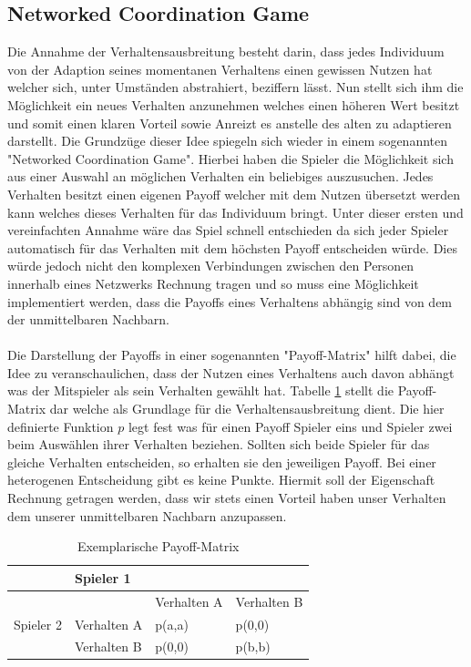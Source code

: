 \documentclass[12pt]{article}
\begin{document}
\subsection{Networked Coordination Game}
Die Annahme der Verhaltensausbreitung besteht darin, dass jedes Individuum von der Adaption seines momentanen Verhaltens einen gewissen Nutzen hat welcher sich, unter Umständen abstrahiert, beziffern lässt. Nun stellt sich ihm die Möglichkeit ein neues Verhalten anzunehmen welches einen höheren Wert besitzt und somit einen klaren Vorteil sowie Anreizt es anstelle des alten zu adaptieren darstellt. Die Grundzüge dieser Idee spiegeln sich wieder in einem sogenannten "Networked Coordination Game". Hierbei haben die Spieler die Möglichkeit sich aus einer Auswahl an möglichen Verhalten ein beliebiges auszusuchen. Jedes Verhalten besitzt einen eigenen Payoff welcher mit dem Nutzen übersetzt werden kann welches dieses Verhalten für das Individuum bringt. Unter dieser ersten und vereinfachten Annahme wäre das Spiel schnell entschieden da sich jeder Spieler automatisch für das Verhalten mit dem höchsten Payoff entscheiden würde. Dies würde jedoch nicht den komplexen Verbindungen zwischen den Personen innerhalb eines Netzwerks Rechnung tragen und so muss eine Möglichkeit implementiert werden, dass die Payoffs eines Verhaltens abhängig sind von dem der unmittelbaren Nachbarn.\\\\ Die Darstellung der Payoffs in einer sogenannten "Payoff-Matrix" hilft dabei, die Idee zu veranschaulichen, dass der Nutzen eines Verhaltens auch davon abhängt was der Mitspieler als sein Verhalten gewählt hat. Tabelle \ref{my-label} stellt die Payoff-Matrix dar welche als Grundlage für die Verhaltensausbreitung dient. Die hier definierte Funktion $p$ legt fest was für einen Payoff Spieler eins und Spieler zwei beim Auswählen ihrer Verhalten beziehen. Sollten sich beide Spieler für das gleiche Verhalten entscheiden, so erhalten sie den jeweiligen Payoff. Bei einer heterogenen Entscheidung gibt es keine Punkte. Hiermit soll der Eigenschaft Rechnung getragen werden, dass wir stets einen Vorteil haben unser Verhalten dem unserer unmittelbaren Nachbarn anzupassen.
\begin{table}[h]
\centering
\caption{Exemplarische Payoff-Matrix}
\label{my-label}
\begin{tabular}{|l|l|l|l|}
\hline
                           & \multicolumn{3}{l|}{Spieler 1}          \\ \hline
\multirow{3}{*}{Spieler 2} &             & Verhalten A & Verhalten B \\ \cline{2-4} 
                           & Verhalten A & p(a,a)      & p(0,0)      \\ \cline{2-4} 
                           & Verhalten B & p(0,0)      & p(b,b)      \\ \hline
\end{tabular}
\end{table}
\end{document}
